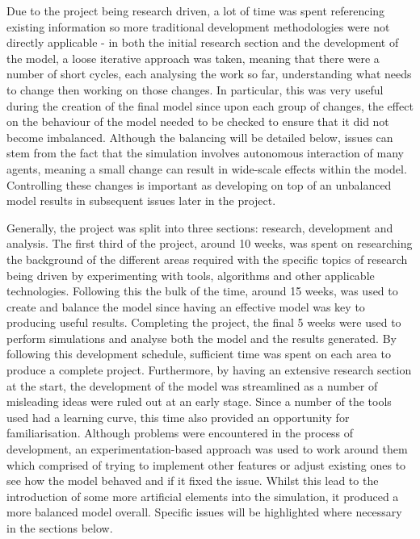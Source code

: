\documentclass[]{report}
\begin{document}
Due to the project being research driven, a lot of time was spent referencing existing information so more traditional development methodologies were not directly applicable - in both the initial research section and the development of the model, a loose iterative approach was taken, meaning that there were a number of short cycles, each analysing the work so far, understanding what needs to change then working on those changes. In particular, this was very useful during the creation of the final model since upon each group of changes, the effect on the behaviour of the model needed to be checked to ensure that it did not become imbalanced. Although the balancing will be detailed below, issues can stem from the fact that the simulation involves autonomous interaction of many agents, meaning a small change can result in wide-scale effects within the model. Controlling these changes is important as developing on top of an unbalanced model results in subsequent issues later in the project.

Generally, the project was split into three sections: research, development and analysis. The first third of the project, around 10 weeks, was spent on researching the background of the different areas required with the specific topics of research being driven by experimenting with tools, algorithms and other applicable technologies. Following this the bulk of the time, around 15 weeks, was used to create and balance the model since having an effective model was key to producing useful results. Completing the project, the final 5 weeks were used to perform simulations and analyse both the model and the results generated. By following this development schedule, sufficient time was spent on each area to produce a complete project. Furthermore, by having an extensive research section at the start, the development of the model was streamlined as a number of misleading ideas were ruled out at an early stage. Since a number of the tools used had a learning curve, this time also provided an opportunity for familiarisation. Although problems were encountered in the process of development, an experimentation-based approach was used to work around them which comprised of trying to implement other features or adjust existing ones to see how the model behaved and if it fixed the issue. Whilst this lead to the introduction of some more artificial elements into the simulation, it produced a more balanced model overall. Specific issues will be highlighted where necessary in the sections below.


%
%
\end{document}
